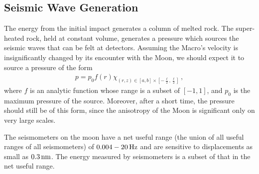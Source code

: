 \documentclass[prd,reprint,10pt,tightenlines]{revtex4-1}
\newcommand*\f[2]{\frac{#1}{#2}}
\begin{document}
\subsection{Seismic Wave Generation}
The energy from the initial impact generates a column of melted rock. The super-heated rock, held at constant volume, generates a pressure which sources the seismic waves that can be felt at detectors. Assuming the Macro's velocity is insignificantly changed by its encounter with the Moon, we should expect it to source a pressure of the form
\begin{align}
p = p_0 f(r)\chi_{(r,z)\in [a,b]\times [-\f \ell 2,\f \ell 2]}\,,
\end{align}
where $f$ is an analytic function whose range is a subset of $[-1,1]$, and $p_0$ is the maximum pressure of the source. Moreover, after a short time, the pressure should still be of this form, since the anisotropy of the Moon is significant only on very large scales.

The seismometers on the moon have a net useful range (the union of all useful ranges of all seismometers) of $0.004-20\text{\,Hz}$ and are sensitive to displacements as small as $0.3\text{\,nm}$. The energy measured by seismometers is a subset of that in the net useful range.
\end{document}
